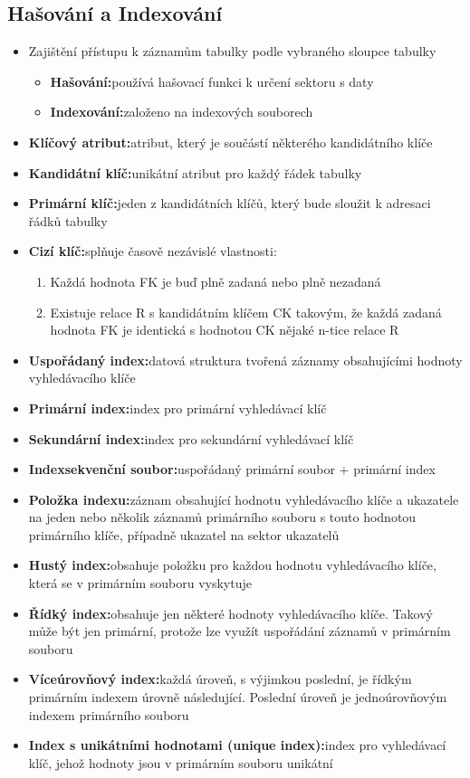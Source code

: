 \documentclass[a4paper,10pt]{article}
\newcommand{\pojem}[2]{\item \textbf{#1:}\quad #2}
\begin{document}
		\subsection{Hašování a Indexování}
			\begin{itemize}
				\item Zajištění přístupu k záznamům tabulky podle vybraného sloupce tabulky
				\begin{itemize}
					\pojem{Hašování}{používá hašovací funkci k určení sektoru s daty}
					\pojem{Indexování}{založeno na indexových souborech}
				\end{itemize}

				\pojem{Klíčový atribut}{atribut, který je součástí některého kandidátního klíče}
				\pojem{Kandidátní klíč}{unikátní atribut pro každý řádek tabulky}
				\pojem{Primární klíč}{jeden z kandidátních klíčů, který bude sloužit k adresaci řádků tabulky}
				\pojem{Cizí klíč}{splňuje časově nezávislé vlastnosti:}
				\begin{enumerate}
					\item Každá hodnota FK je buď plně zadaná nebo plně nezadaná
					\item Existuje relace R s kandidátním klíčem CK takovým, že každá zadaná hodnota FK je identická s hodnotou CK nějaké n-tice relace R
				\end{enumerate}
				
				\pojem{Uspořádaný index}{datová struktura tvořená záznamy obsahujícími hodnoty vyhledávacího klíče}

				\pojem{Primární index}{index pro primární vyhledávací klíč}

				\pojem{Sekundární index}{index pro sekundární vyhledávací klíč}

				\pojem{Indexsekvenční soubor}{uspořádaný primární soubor + primární index}

				\pojem{Položka indexu}{záznam obsahující hodnotu vyhledávacího klíče a ukazatele na jeden nebo několik záznamů primárního souboru s touto hodnotou primárního klíče, případně ukazatel na sektor ukazatelů}

				\pojem{Hustý index}{obsahuje položku pro každou hodnotu vyhledávacího klíče, která se v primárním souboru vyskytuje}

				\pojem{Řídký index}{obsahuje jen některé hodnoty vyhledávacího klíče. Takový může být jen primární, protože lze využít uspořádání záznamů v primárním souboru}

				\pojem{Víceúrovňový index}{každá úroveň, s výjimkou poslední, je řídkým primárním indexem úrovně následující. Poslední úroveň je jednoúrovňovým indexem primárního souboru}

				\pojem{Index s unikátními hodnotami (unique index)}{index pro vyhledávací klíč, jehož hodnoty jsou v primárním souboru unikátní}
			\end{itemize}
\end{document}
